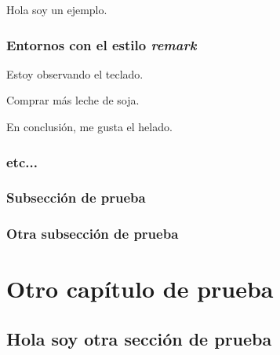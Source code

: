 \begin{example}
Hola soy un ejemplo.
\end{example}

\subsection{Entornos con el estilo \textit{remark}}

\begin{remark}[Observación]
Estoy observando el teclado.
\end{remark}

\begin{note}
Comprar más leche de soja.
\end{note}
\begin{conclusion}
En conclusión, me gusta el helado.
\end{conclusion}


\subsection{etc...}
\rc{\lipsum[4-7]}



\subsection{Subsección de prueba}
\rc{\lipsum[8]}
\subsection{Otra subsección de prueba}
\rc{\lipsum[9-20]}
\chapter{Otro capítulo de prueba}
\rc{\lipsum[10]}
\section{Hola soy otra sección de prueba}
\rc{\lipsum[11-40]}